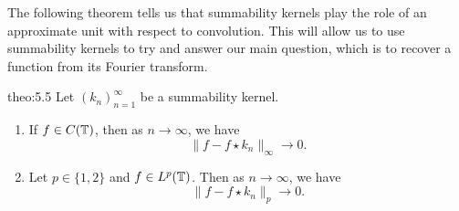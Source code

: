 The following theorem tells us that summability kernels play the role of an approximate 
unit with respect to convolution. This will allow us to use summability 
kernels to try and answer our main question, which is to recover a function 
from its Fourier transform. 

\begin{theo}{theo:5.5}
    Let $(k_n)_{n=1}^\infty$ be a summability kernel. 
    \begin{enumerate}[(1)]
        \item If $f \in C(\mathbb{T})$, then as $n \to \infty$, we have 
        \[ \|f - f \star k_n\|_\infty \to 0. \] 
        \item Let $p \in \{1, 2\}$ and $f \in L^p(\mathbb{T})$. Then as $n \to \infty$, we have 
        \[ \|f - f \star k_n\|_p \to 0. \] 
    \end{enumerate}
\end{theo}
